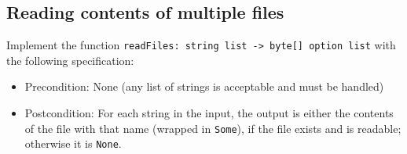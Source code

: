 \subsection*{Reading contents of multiple files}
 
Implement the function \texttt{readFiles: string list -> byte[] option list} with the following specification:
\begin{itemize}
\item Precondition: None (any list of strings is acceptable and must be handled)
\item Postcondition: For each string in the input, the output is either the contents of the file with that name (wrapped in \texttt{Some}), if the file exists and is readable; otherwise it is \texttt{None}.  
\end{itemize}
